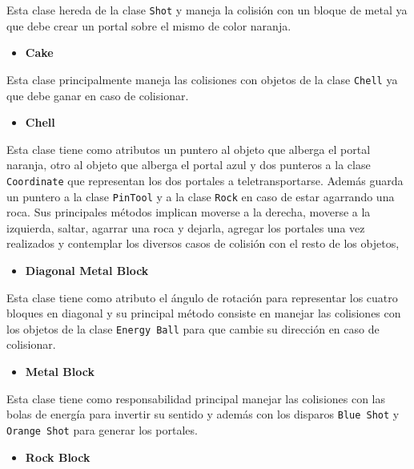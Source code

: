 \documentclass[a4paper]{article}
\begin{document}
Esta clase hereda de la clase \texttt{Shot} y maneja la colisión con un bloque de metal ya que debe crear un portal sobre el mismo de color naranja.

\begin{itemize}
	\item \textbf{Cake}
\end{itemize}

Esta clase principalmente maneja las colisiones con objetos de la clase \texttt{Chell} ya que debe ganar en caso de colisionar.

\begin{itemize}
	\item \textbf{Chell}
\end{itemize}

Esta clase tiene como atributos un puntero al objeto que alberga el portal naranja, otro al objeto que alberga el portal azul y dos punteros a la clase \texttt{Coordinate} que representan los dos portales a teletransportarse. Además guarda un puntero a la clase \texttt{PinTool} y a la clase \texttt{Rock} en caso de estar agarrando una roca. Sus principales métodos implican moverse a la derecha, moverse a la izquierda, saltar, agarrar una roca y dejarla, agregar los portales una vez realizados y contemplar los diversos casos de colisión con el resto de los objetos,

\begin{itemize}
	\item \textbf{Diagonal Metal Block}
\end{itemize}

Esta clase tiene como atributo el ángulo de rotación para representar los cuatro bloques en diagonal y su principal método consiste en manejar las colisiones con los objetos de la clase \texttt{Energy Ball} para que cambie su dirección en caso de colisionar.

\begin{itemize}
	\item \textbf{Metal Block}
\end{itemize}

Esta clase tiene como responsabilidad principal manejar las colisiones con las bolas de energía para invertir su sentido y además con los disparos \texttt{Blue Shot} y \texttt{Orange Shot} para generar los portales.

\begin{itemize}
	\item \textbf{Rock Block}
\end{itemize}
\end{document}
